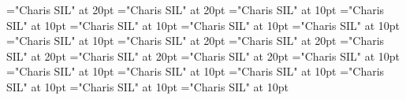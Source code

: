 \documentclass[a4paper]{article}
\begin{document}
\pagestyle{plain}
\sloppy
\setlength{\parfillskip}{0pt plus 1fil}
\font\pronunciationenUKpronunciationbefore="Charis SIL" at 20pt
\font\pronunciationenUSpronunciationbefore="Charis SIL" at 20pt
\font\sectionletterdictionary="Charis SIL" at 10pt
\font\headsectionletterdictionary="Charis SIL" at 10pt
\font\articledictionary="Charis SIL" at 10pt
\font\firstoftypeheadwordlastoftypearticledictionary="Charis SIL" at 10pt
\font\firstoftypegrammarrequireslastoftypearticledictionary="Charis SIL" at 10pt
\font\firstoftypelastoftyperelationsynonymarticledictionary="Charis SIL" at 10pt
\font\firstoftypepronunciationenUKarticledictionary="Charis SIL" at 20pt
\font\pronunciationenUKpronunciationbeforearticledictionary="Charis SIL" at 20pt
\font\lastoftypepronunciationenUSarticledictionary="Charis SIL" at 20pt
\font\pronunciationenUSpronunciationbeforearticledictionary="Charis SIL" at 20pt
\font\lastoftypepronunciationenUKarticledictionary="Charis SIL" at 20pt
\font\firstoftypegrammarcategorylastoftypearticledictionary="Charis SIL" at 10pt
\font{}="Charis SIL" at 10pt
\font\firstoftypelastoftypenotearticledictionary="Charis SIL" at 10pt
\font\exampleusefirstoftypearticledictionary="Charis SIL" at 10pt
\font\examplefirstoftypearticledictionary="Charis SIL" at 10pt
\font\exampleuselastoftypearticledictionary="Charis SIL" at 10pt
\font\examplelastoftypearticledictionary="Charis SIL" at 10pt

\pagestyle{fancy} 


\end{document}
